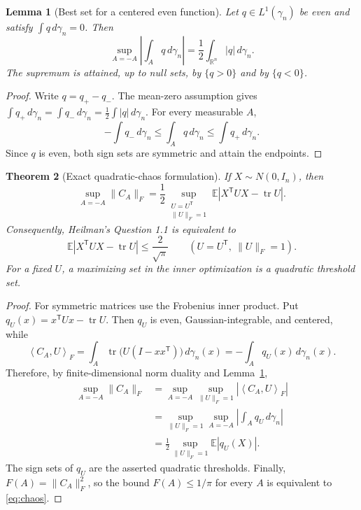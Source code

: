 \documentclass[11pt]{article}
\newtheorem{theorem}{Theorem}
\newtheorem{lemma}[theorem]{Lemma}
\newcommand{\R}{\mathbb R}
\newcommand{\E}{\mathbb E}
\newcommand{\tr}{\operatorname{tr}}
\newcommand{\ip}[2]{\left\langle #1,#2\right\rangle}
\begin{document}
\begin{lemma}[Best set for a centered even function]\label{lem:set}
Let $q\in L^1(\gamma_n)$ be even and satisfy $\int q\,d\gamma_n=0$.  Then
\[
 \sup_{A=-A}\left|\int_Aq\,d\gamma_n\right|
 =\frac12\int_{\R^n}|q|\,d\gamma_n.
\]
The supremum is attained, up to null sets, by $\{q>0\}$ and by $\{q<0\}$.
\end{lemma}

\begin{proof}
Write $q=q_+-q_-$.  The mean-zero assumption gives
$\int q_+\,d\gamma_n=\int q_-\,d\gamma_n=\frac12\int|q|\,d\gamma_n$.
For every measurable $A$,
\[
 -\int q_-\,d\gamma_n\leq \int_Aq\,d\gamma_n
 \leq \int q_+\,d\gamma_n.
\]
Since $q$ is even, both sign sets are symmetric and attain the endpoints.
\end{proof}

\begin{theorem}[Exact quadratic-chaos formulation]\label{thm:reduction}
If $X\sim N(0,I_n)$, then
\[
 \sup_{A=-A}\|C_A\|_F
 =\frac12\sup_{\substack{U=U^{\mathsf T}\\\|U\|_F=1}}
 \E\left|X^{\mathsf T}UX-\tr U\right|.
\]
Consequently, Heilman's Question 1.1 is equivalent to
\begin{equation}\label{eq:chaos}
 \E\left|X^{\mathsf T}UX-\tr U\right|\leq\frac{2}{\sqrt\pi}
 \qquad(U=U^{\mathsf T},\ \|U\|_F=1).
\end{equation}
For a fixed $U$, a maximizing set in the inner optimization is a quadratic
threshold set.
\end{theorem}

\begin{proof}
For symmetric matrices use the Frobenius inner product.  Put
$q_U(x)=x^{\mathsf T}Ux-\tr U$.  Then $q_U$ is even, Gaussian-integrable,
and centered, while
\[
 \ip{C_A}{U}_F
 =\int_A\tr\bigl(U(I-xx^{\mathsf T})\bigr)\,d\gamma_n(x)
 =-\int_Aq_U(x)\,d\gamma_n(x).
\]
Therefore, by finite-dimensional norm duality and Lemma~\ref{lem:set},
\begin{align*}
 \sup_{A=-A}\|C_A\|_F
 &=\sup_{A=-A}\sup_{\|U\|_F=1}|\ip{C_A}{U}_F|\\
 &=\sup_{\|U\|_F=1}\sup_{A=-A}\left|\int_Aq_U\,d\gamma_n\right|\\
 &=\frac12\sup_{\|U\|_F=1}\E|q_U(X)|.
\end{align*}
The sign sets of $q_U$ are the asserted quadratic thresholds.  Finally,
$F(A)=\|C_A\|_F^2$, so the bound $F(A)\leq1/\pi$ for every $A$ is
equivalent to \eqref{eq:chaos}.
\end{proof}
\end{document}
